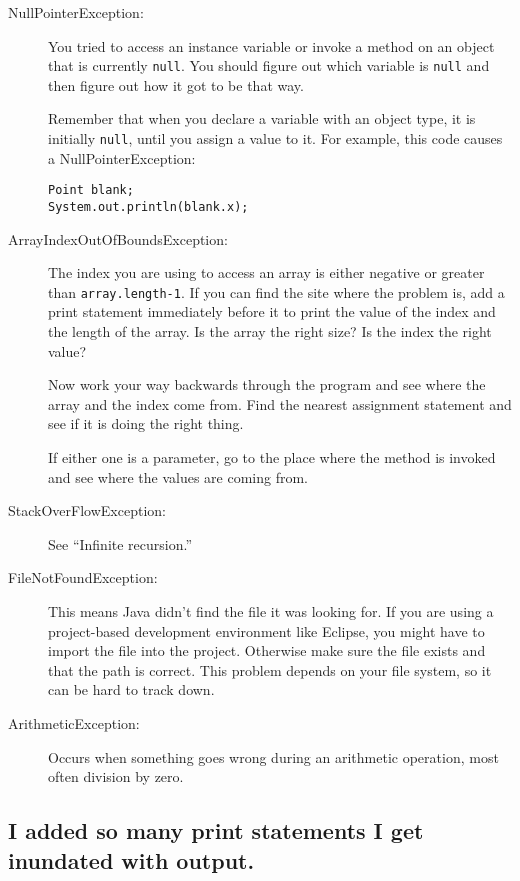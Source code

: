 \documentclass[12pt]{book}
\theoremstyle{definition}
\begin{document}
\begin{description}

\item[NullPointerException:] You tried to access an instance
variable or invoke a method on an object that is currently
{\tt null}.  You should figure out which variable is {\tt null}
and then figure out how it got to be that way.

Remember that when you declare a variable with an object type,
it is initially {\tt null}, until you assign a value to it.
For example, this code causes a NullPointerException:

\begin{lstlisting}
Point blank;
System.out.println(blank.x);
\end{lstlisting}

\item[ArrayIndexOutOfBoundsException:] The index you are using
to access an array is either negative or greater than
{\tt array.length-1}.  If you can find the site where the
problem is, add a print statement immediately before it to
print the value of the index and the length of the array.
Is the array the right size?  Is the index the right value?

Now work your way backwards through the program and see where
the array and the index come from.  Find the nearest assignment
statement and see if it is doing the right thing.

If either one is a parameter, go to the place where the method
is invoked and see where the values are coming from.

\item[StackOverFlowException:] See ``Infinite recursion.''

\item[FileNotFoundException:] This means Java didn't find the file
it was looking for.  If you are using a project-based development
environment like Eclipse, you might have to import the file into
the project.  Otherwise make sure the file exists and that the
path is correct.  This problem depends on your file system, so it
can be hard to track down.

\item[ArithmeticException:] Occurs when something goes wrong during
an arithmetic operation, most often division by zero.

\end{description}


\subsection*{I added so many print statements I get inundated with
output.}
\end{document}
